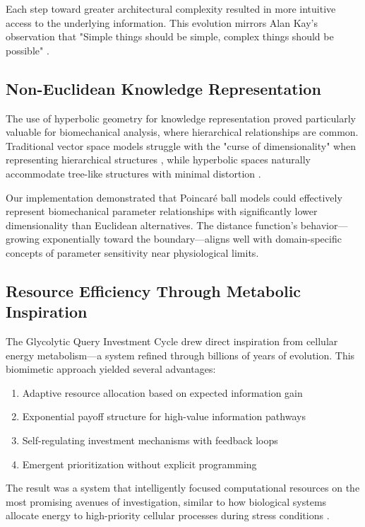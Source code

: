 \documentclass[journal,onecolumn]{IEEEtran}
\begin{document}
Each step toward greater architectural complexity resulted in more intuitive access to the underlying information. This evolution mirrors Alan Kay's observation that "Simple things should be simple, complex things should be possible" \cite{kay1989user}.

\subsection{Non-Euclidean Knowledge Representation}

The use of hyperbolic geometry for knowledge representation proved particularly valuable for biomechanical analysis, where hierarchical relationships are common. Traditional vector space models struggle with the "curse of dimensionality" when representing hierarchical structures \cite{bengio2013representation}, while hyperbolic spaces naturally accommodate tree-like structures with minimal distortion \cite{nickel2017poincare}.

Our implementation demonstrated that Poincaré ball models could effectively represent biomechanical parameter relationships with significantly lower dimensionality than Euclidean alternatives. The distance function's behavior—growing exponentially toward the boundary—aligns well with domain-specific concepts of parameter sensitivity near physiological limits.

\subsection{Resource Efficiency Through Metabolic Inspiration}

The Glycolytic Query Investment Cycle drew direct inspiration from cellular energy metabolism—a system refined through billions of years of evolution. This biomimetic approach yielded several advantages:

\begin{enumerate}
\item Adaptive resource allocation based on expected information gain
\item Exponential payoff structure for high-value information pathways
\item Self-regulating investment mechanisms with feedback loops
\item Emergent prioritization without explicit programming
\end{enumerate}

The result was a system that intelligently focused computational resources on the most promising avenues of investigation, similar to how biological systems allocate energy to high-priority cellular processes during stress conditions \cite{hardie2007amp}.
\end{document}
